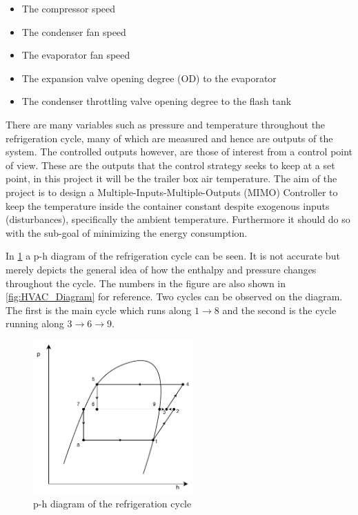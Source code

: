 \begin{itemize}
	\item The compressor speed
	\item The condenser fan speed
	\item The evaporator fan speed
	\item The expansion valve opening degree (OD) to the evaporator
	\item The condenser throttling valve opening degree to the flash tank
\end{itemize}

There are many variables such as pressure and temperature throughout the refrigeration cycle, many of which are measured and hence are outputs of the system. 
The controlled outputs however, are those of interest from a control point of view. These are the outputs that the control strategy seeks to keep at a set point, in this project it will be the trailer box air temperature. The aim of the project is to design a Multiple-Inputs-Multiple-Outputs (MIMO) Controller to keep the temperature inside the container constant despite exogenous inputs (disturbances), specifically the ambient temperature. Furthermore it should do so with the sub-goal of minimizing the energy consumption.


In \cref{fig:p-h_diagram} a p-h diagram of the refrigeration cycle can be seen. It is not accurate but merely depicts the general idea of how the enthalpy and pressure changes throughout the cycle. The numbers in the figure are also shown in \cref{fig:HVAC_Diagram} for reference. Two cycles can be observed on the diagram. The first is the main cycle which runs along $1 \rightarrow 8$ and the second is the cycle running along $3\rightarrow 6 \rightarrow 9$.

\begin{figure}[h!]
	\centering
	\includegraphics[width=0.55\textwidth]{Graphics/Flash_Tank_P-h_Diagram}
	\caption{p-h diagram of the refrigeration cycle}
	\label{fig:p-h_diagram}
\end{figure}




